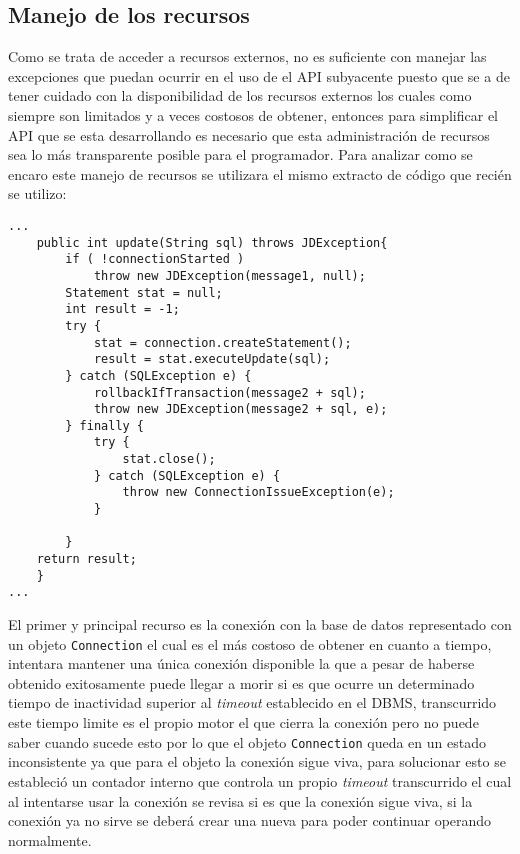 \subsection{Manejo de los recursos}
Como \jd se trata de acceder a recursos externos, no es suficiente con manejar las excepciones que puedan ocurrir en el uso de el API subyacente puesto que se a de tener cuidado con la disponibilidad de los recursos externos los cuales como siempre son limitados y a veces costosos de obtener, entonces para simplificar el API que se esta desarrollando es necesario que esta administración de recursos sea lo más transparente posible para el programador. Para analizar como se encaro este manejo de recursos se utilizara el mismo extracto de código que recién se utilizo:
\newpage
%
\begin{lstlisting}[title=función extraída de JDBCManager]
...
	public int update(String sql) throws JDException{
		if ( !connectionStarted ) 
			throw new JDException(message1, null);
		Statement stat = null;
		int result = -1;
		try {
			stat = connection.createStatement();
			result = stat.executeUpdate(sql);
		} catch (SQLException e) {
			rollbackIfTransaction(message2 + sql);
			throw new JDException(message2 + sql, e);
		} finally {
			try {
				stat.close();
			} catch (SQLException e) {
				throw new ConnectionIssueException(e);
			}
			
		}
	return result; 
	}
...
\end{lstlisting}
%
El primer y principal recurso es la conexión con la base de datos representado con un objeto \verb=Connection= el cual es el más costoso de obtener en cuanto a tiempo, \jd intentara mantener una única conexión disponible la que a pesar de haberse obtenido exitosamente puede llegar a morir si es que ocurre un determinado tiempo de inactividad superior al \textit{timeout} establecido en el DBMS, transcurrido este tiempo limite es el propio motor el que cierra la conexión pero \jd no puede saber cuando sucede esto por lo que el objeto \verb=Connection= queda en un estado inconsistente ya que para el objeto la conexión sigue viva, para solucionar esto se estableció un contador interno que controla un propio \textit{timeout} transcurrido el cual al intentarse usar la conexión se revisa si es que la conexión sigue viva, si la conexión ya no sirve se deberá crear una nueva para poder continuar operando normalmente.

